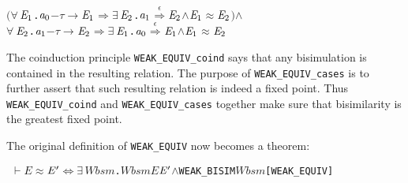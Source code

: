 \documentclass[GCNS]{yincog}
\renewcommand{\HOLConst}[1]{\texttt{#1}}
\renewcommand{\HOLBoundVar}[1]{\ensuremath{\mathit{#1}}}
\renewcommand{\HOLFreeVar}[1]{\ensuremath{\mathit{#1}}}
\renewcommand{\HOLSymConst}[1]{#1}
\renewcommand{\HOLTokenConj}{\ensuremath{\wedge}}
\renewcommand{\HOLTokenEquiv}{\ensuremath{\Longleftrightarrow}}
\renewcommand{\HOLTokenExists}{\ensuremath{\exists \,}}
\renewcommand{\HOLTokenForall}{\ensuremath{\forall \,}}
\renewcommand{\HOLTokenTurnstile}{\ensuremath{\:\:\vdash}}
\theoremstyle{remark}
\theoremstyle{theorem}
\theoremstyle{remark}
\newcommand{\HOLTokenWeakEQ}{$\approx$}
\newcommand{\HOLTokenEPS}{$\overset{\epsilon}{\Longrightarrow}$}
\newcommand{\HOLTokenTransBegin}{$-$}
\newcommand{\HOLTokenTransEnd}{$\rightarrow$\xspace}
\renewcommand{\HOLTokenImp}{\ensuremath{\Longrightarrow}}
\begin{document}
\begin{itemize}
\begin{alltt}
   \ensuremath{(}\HOLSymConst{\HOLTokenForall{}}\ensuremath{\HOLBoundVar{E}\sb{\mathrm{1}}}. \ensuremath{\HOLFreeVar{a}\sb{\mathrm{0}}} \HOLTokenTransBegin\HOLSymConst{\ensuremath{\tau}}\HOLTokenTransEnd \ensuremath{\HOLBoundVar{E}\sb{\mathrm{1}}} \HOLSymConst{\HOLTokenImp{}} \HOLSymConst{\HOLTokenExists{}}\ensuremath{\HOLBoundVar{E}\sb{\mathrm{2}}}. \ensuremath{\HOLFreeVar{a}\sb{\mathrm{1}}} \HOLSymConst{\HOLTokenEPS} \ensuremath{\HOLBoundVar{E}\sb{\mathrm{2}}} \HOLSymConst{\HOLTokenConj{}} \ensuremath{\HOLBoundVar{E}\sb{\mathrm{1}}} \HOLSymConst{\HOLTokenWeakEQ} \ensuremath{\HOLBoundVar{E}\sb{\mathrm{2}}}\ensuremath{)} \HOLSymConst{\HOLTokenConj{}}
   \HOLSymConst{\HOLTokenForall{}}\ensuremath{\HOLBoundVar{E}\sb{\mathrm{2}}}. \ensuremath{\HOLFreeVar{a}\sb{\mathrm{1}}} \HOLTokenTransBegin\HOLSymConst{\ensuremath{\tau}}\HOLTokenTransEnd \ensuremath{\HOLBoundVar{E}\sb{\mathrm{2}}} \HOLSymConst{\HOLTokenImp{}} \HOLSymConst{\HOLTokenExists{}}\ensuremath{\HOLBoundVar{E}\sb{\mathrm{1}}}. \ensuremath{\HOLFreeVar{a}\sb{\mathrm{0}}} \HOLSymConst{\HOLTokenEPS} \ensuremath{\HOLBoundVar{E}\sb{\mathrm{1}}} \HOLSymConst{\HOLTokenConj{}} \ensuremath{\HOLBoundVar{E}\sb{\mathrm{1}}} \HOLSymConst{\HOLTokenWeakEQ} \ensuremath{\HOLBoundVar{E}\sb{\mathrm{2}}}
\end{alltt}
%
\end{itemize}

The coinduction principle \texttt{WEAK\_EQUIV\_coind} says that any bisimulation
is contained in the resulting relation. The purpose of
\texttt{WEAK\_EQUIV\_cases} is to further assert that such resulting relation
is indeed a fixed point. Thus \texttt{WEAK\_EQUIV\_coind} and
\texttt{WEAK\_EQUIV\_cases} together make sure that bisimilarity is the greatest
fixed point.

The original definition of \texttt{WEAK\_EQUIV} now becomes a theorem:
%
\begin{alltt}
\HOLTokenTurnstile{} \HOLFreeVar{E} \HOLSymConst{\HOLTokenWeakEQ} \ensuremath{\HOLFreeVar{E}\sp{\prime}} \HOLSymConst{\HOLTokenEquiv{}} \HOLSymConst{\HOLTokenExists{}}\HOLBoundVar{Wbsm}. \HOLBoundVar{Wbsm} \HOLFreeVar{E} \ensuremath{\HOLFreeVar{E}\sp{\prime}} \HOLSymConst{\HOLTokenConj{}} \HOLConst{WEAK\_BISIM} \HOLBoundVar{Wbsm}\hfill{[WEAK\_EQUIV]}
\end{alltt}
\end{document}
